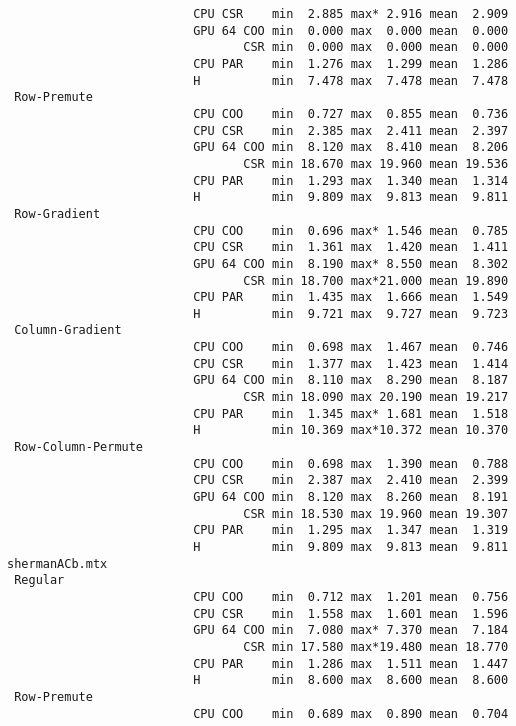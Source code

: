 {\begin{verbatim}
                          CPU CSR    min  2.885 max* 2.916 mean  2.909
                          GPU 64 COO min  0.000 max  0.000 mean  0.000
                                 CSR min  0.000 max  0.000 mean  0.000
                          CPU PAR    min  1.276 max  1.299 mean  1.286
                          H          min  7.478 max  7.478 mean  7.478
 Row-Premute
                          CPU COO    min  0.727 max  0.855 mean  0.736
                          CPU CSR    min  2.385 max  2.411 mean  2.397
                          GPU 64 COO min  8.120 max  8.410 mean  8.206
                                 CSR min 18.670 max 19.960 mean 19.536
                          CPU PAR    min  1.293 max  1.340 mean  1.314
                          H          min  9.809 max  9.813 mean  9.811
 Row-Gradient
                          CPU COO    min  0.696 max* 1.546 mean  0.785
                          CPU CSR    min  1.361 max  1.420 mean  1.411
                          GPU 64 COO min  8.190 max* 8.550 mean  8.302
                                 CSR min 18.700 max*21.000 mean 19.890
                          CPU PAR    min  1.435 max  1.666 mean  1.549
                          H          min  9.721 max  9.727 mean  9.723
 Column-Gradient
                          CPU COO    min  0.698 max  1.467 mean  0.746
                          CPU CSR    min  1.377 max  1.423 mean  1.414
                          GPU 64 COO min  8.110 max  8.290 mean  8.187
                                 CSR min 18.090 max 20.190 mean 19.217
                          CPU PAR    min  1.345 max* 1.681 mean  1.518
                          H          min 10.369 max*10.372 mean 10.370
 Row-Column-Permute
                          CPU COO    min  0.698 max  1.390 mean  0.788
                          CPU CSR    min  2.387 max  2.410 mean  2.399
                          GPU 64 COO min  8.120 max  8.260 mean  8.191
                                 CSR min 18.530 max 19.960 mean 19.307
                          CPU PAR    min  1.295 max  1.347 mean  1.319
                          H          min  9.809 max  9.813 mean  9.811
shermanACb.mtx
 Regular
                          CPU COO    min  0.712 max  1.201 mean  0.756
                          CPU CSR    min  1.558 max  1.601 mean  1.596
                          GPU 64 COO min  7.080 max* 7.370 mean  7.184
                                 CSR min 17.580 max*19.480 mean 18.770
                          CPU PAR    min  1.286 max  1.511 mean  1.447
                          H          min  8.600 max  8.600 mean  8.600
 Row-Premute
                          CPU COO    min  0.689 max  0.890 mean  0.704

\end{verbatim}}
